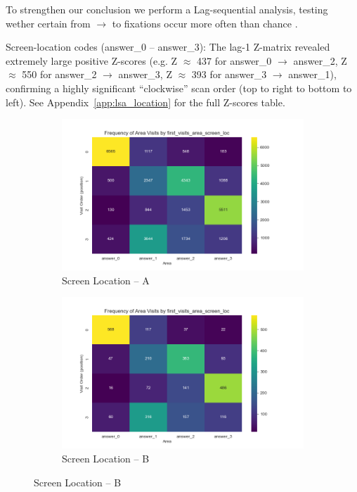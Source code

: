\documentclass[manuscript,review,anonymous]{acmart}
\begin{document}
    To strengthen our conclusion we perform a Lag-sequential analysis, testing wether certain from $\to$ to fixations occur more often than chance \cite{bakeman1995log}.

    Screen-location codes (answer\_0 -- answer\_3): The lag-1 Z-matrix revealed extremely large positive Z-scores (e.g. Z  $\approx$ 437 for answer\_0 $\to$ answer\_2, Z $\approx$ 550 for answer\_2 $\to$ answer\_3, Z  $\approx$ 393 for answer\_3 $\to$ answer\_1), confirming a highly significant “clockwise” scan order (top to right to bottom to left). See Appendix~\ref{app:lsa_location} for the full Z-scores table.


        \begin{figure}[htbp]
          \centering
        
          \begin{subfigure}{0.48\linewidth}
            \includegraphics[width=\linewidth]{plots/visits/matrix__first_visits_area_screen_loc_hunters_A.png}
            \caption{Screen Location – A}
            \label{fig:hunt_a}
          \end{subfigure}\hfill
          \begin{subfigure}{0.48\linewidth}
            \includegraphics[width=\linewidth]{plots/visits/matrix__first_visits_area_screen_loc_hunters_B.png}
            \caption{Screen Location – B}
            \label{fig:hunt_b}
          \end{subfigure}
        

\end{figure}
\end{document}
